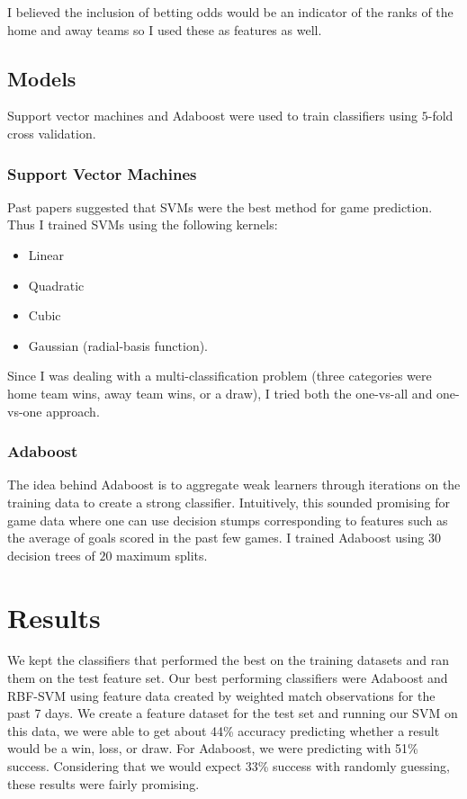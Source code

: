 \documentclass[paper=a4, fontsize=11pt]{scrartcl}
\numberwithin{equation}{section}		%
\numberwithin{figure}{section}			%
\numberwithin{table}{section}				%
\begin{document}
I believed the inclusion of betting odds would be an indicator of the ranks of the home and away teams so I used these as features as well.

\subsection{Models}

Support vector machines and Adaboost were used to train classifiers using $5$-fold cross validation.

\subsubsection{Support Vector Machines}

Past papers suggested that SVMs were the best method for game prediction. Thus I trained SVMs using the following kernels:
\begin{itemize}
\item Linear
\item Quadratic
\item Cubic
\item Gaussian (radial-basis function).
\end{itemize}

Since I was dealing with a multi-classification problem (three categories were home team wins, away team wins, or a draw), I tried both the one-vs-all and one-vs-one approach.

\subsubsection{Adaboost}

The idea behind Adaboost is to aggregate weak learners through iterations on the training data to create a strong classifier. Intuitively, this sounded promising for game data where one can use decision stumps corresponding to features such as the average of goals scored in the past few games. I trained Adaboost using $30$ decision trees of $20$ maximum splits.

\section{Results}

We kept the classifiers that performed the best on the training datasets and ran them on the test feature set. Our best performing classifiers were Adaboost and RBF-SVM using feature data created by weighted match observations for the past 7 days.  We create a feature dataset for the test set and running our SVM on this data, we were able to get about 44\% accuracy predicting whether a result would be a win, loss, or draw. For Adaboost, we were predicting with 51\% success. Considering that we would expect 33\% success with randomly guessing, these results were fairly promising.
\end{document}
